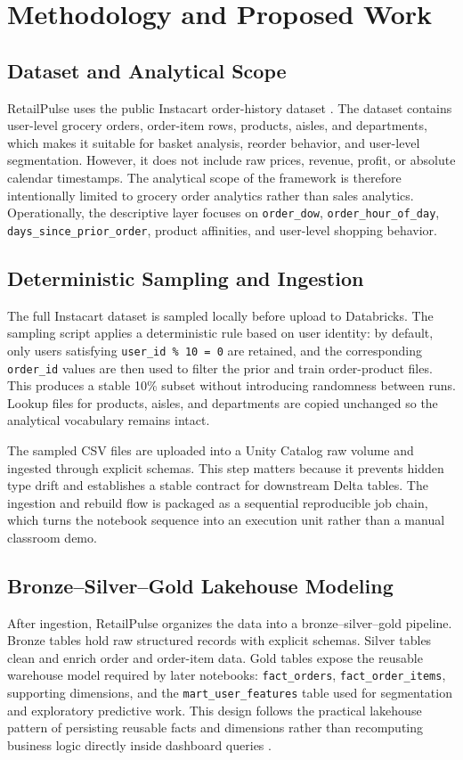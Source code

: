 \documentclass[journal]{IEEEtran}
\begin{document}
\section{Methodology and Proposed Work}
\subsection{Dataset and Analytical Scope}
RetailPulse uses the public Instacart order-history dataset \cite{instacart_dataset}. The dataset contains user-level grocery orders, order-item rows, products, aisles, and departments, which makes it suitable for basket analysis, reorder behavior, and user-level segmentation. However, it does not include raw prices, revenue, profit, or absolute calendar timestamps. The analytical scope of the framework is therefore intentionally limited to grocery order analytics rather than sales analytics. Operationally, the descriptive layer focuses on \texttt{order\_dow}, \texttt{order\_hour\_of\_day}, \texttt{days\_since\_prior\_order}, product affinities, and user-level shopping behavior.

\subsection{Deterministic Sampling and Ingestion}
The full Instacart dataset is sampled locally before upload to Databricks. The sampling script applies a deterministic rule based on user identity: by default, only users satisfying \texttt{user\_id \% 10 = 0} are retained, and the corresponding \texttt{order\_id} values are then used to filter the prior and train order-product files. This produces a stable 10\% subset without introducing randomness between runs. Lookup files for products, aisles, and departments are copied unchanged so the analytical vocabulary remains intact.

The sampled CSV files are uploaded into a Unity Catalog raw volume and ingested through explicit schemas. This step matters because it prevents hidden type drift and establishes a stable contract for downstream Delta tables. The ingestion and rebuild flow is packaged as a sequential reproducible job chain, which turns the notebook sequence into an execution unit rather than a manual classroom demo.

\subsection{Bronze--Silver--Gold Lakehouse Modeling}
After ingestion, RetailPulse organizes the data into a bronze--silver--gold pipeline. Bronze tables hold raw structured records with explicit schemas. Silver tables clean and enrich order and order-item data. Gold tables expose the reusable warehouse model required by later notebooks: \texttt{fact\_orders}, \texttt{fact\_order\_items}, supporting dimensions, and the \texttt{mart\_user\_features} table used for segmentation and exploratory predictive work. This design follows the practical lakehouse pattern of persisting reusable facts and dimensions rather than recomputing business logic directly inside dashboard queries \cite{armbrust2020deltalake,zaharia2021lakehouse}.
\end{document}
